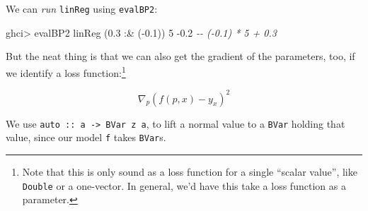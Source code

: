 \documentclass[]{article}
\newenvironment{Shaded}{}{}
\newcommand{\CommentTok}[1]{\textcolor[rgb]{0.38,0.63,0.69}{\textit{#1}}}
\newcommand{\DataTypeTok}[1]{\textcolor[rgb]{0.56,0.13,0.00}{#1}}
\newcommand{\DecValTok}[1]{\textcolor[rgb]{0.25,0.63,0.44}{#1}}
\newcommand{\FloatTok}[1]{\textcolor[rgb]{0.25,0.63,0.44}{#1}}
\newcommand{\NormalTok}[1]{#1}
\newcommand{\OperatorTok}[1]{\textcolor[rgb]{0.40,0.40,0.40}{#1}}
\newcommand{\OtherTok}[1]{\textcolor[rgb]{0.00,0.44,0.13}{#1}}
\begin{document}
We can \emph{run} \texttt{linReg} using \texttt{evalBP2}:

\begin{Shaded}
\begin{Highlighting}[]
\NormalTok{ghci}\OperatorTok{\textgreater{}}\NormalTok{ evalBP2 linReg (}\FloatTok{0.3} \OperatorTok{:\&}\NormalTok{ (}\OperatorTok{{-}}\FloatTok{0.1}\NormalTok{)) }\DecValTok{5}
\OperatorTok{{-}}\FloatTok{0.2}        \CommentTok{{-}{-} ({-}0.1) * 5 + 0.3}
\end{Highlighting}
\end{Shaded}

But the neat thing is that we can also get the gradient of the parameters, too,
if we identify a loss function:\footnote{Note that this is only sound as a loss
  function for a single ``scalar value'', like \texttt{Double} or a one-vector.
  In general, we'd have this take a loss function as a parameter.}

\[
\nabla_p (f(p, x) - y_x)^2
\]

\begin{Shaded}
\end{Shaded}

We use \texttt{auto\ ::\ a\ -\textgreater{}\ BVar\ z\ a}, to lift a normal value
to a \texttt{BVar} holding that value, since our model \texttt{f} takes
\texttt{BVar}s.
\end{document}
